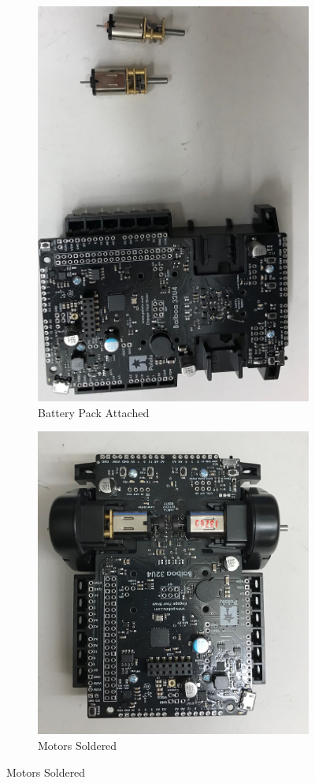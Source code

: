 \documentclass{article}
\begin{document}
\begin{figure}[H]
    \caption{Robot Assmebly Process}
    \begin{subfigure}{0.49 \textwidth}
        \centering
        \includegraphics[width=0.7\linewidth]{robot0.jpg}
        \caption{Battery Pack Attached}
        \label{robot0}
    \end{subfigure}
    \begin{subfigure}{0.49 \textwidth}
        \centering
        \includegraphics[width=0.9\linewidth]{robot1.jpg}
        \caption{Motors Soldered}
        \label{robot1}
    \end{subfigure}
    

\end{figure}
\end{document}

